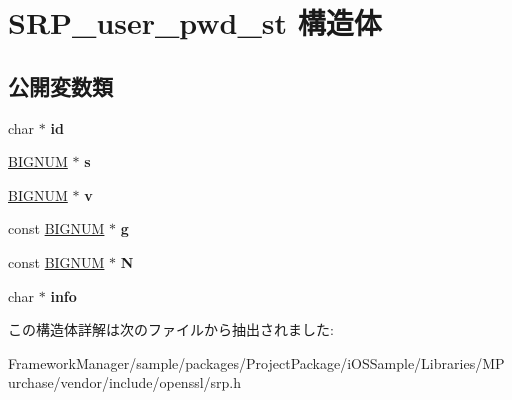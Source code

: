 \hypertarget{struct_s_r_p__user__pwd__st}{}\section{S\+R\+P\+\_\+user\+\_\+pwd\+\_\+st 構造体}
\label{struct_s_r_p__user__pwd__st}
\subsection*{公開変数類}
\begin{DoxyCompactItemize}
\item 
\hypertarget{struct_s_r_p__user__pwd__st_aac2cd2ebc30d6a9834480589fea69085}{}char $\ast$ {\bfseries id}\label{struct_s_r_p__user__pwd__st_aac2cd2ebc30d6a9834480589fea69085}

\item 
\hypertarget{struct_s_r_p__user__pwd__st_a0307e6a70f90139d77f610d6bb956513}{}\hyperlink{structbignum__st}{B\+I\+G\+N\+U\+M} $\ast$ {\bfseries s}\label{struct_s_r_p__user__pwd__st_a0307e6a70f90139d77f610d6bb956513}

\item 
\hypertarget{struct_s_r_p__user__pwd__st_a2eed7def431386ce2b0a80c7df559529}{}\hyperlink{structbignum__st}{B\+I\+G\+N\+U\+M} $\ast$ {\bfseries v}\label{struct_s_r_p__user__pwd__st_a2eed7def431386ce2b0a80c7df559529}

\item 
\hypertarget{struct_s_r_p__user__pwd__st_a66e1a6f4c6de6a26791cd9dac942f2bc}{}const \hyperlink{structbignum__st}{B\+I\+G\+N\+U\+M} $\ast$ {\bfseries g}\label{struct_s_r_p__user__pwd__st_a66e1a6f4c6de6a26791cd9dac942f2bc}

\item 
\hypertarget{struct_s_r_p__user__pwd__st_a42b7405c1f178f4a7e907cb15fdcf9b8}{}const \hyperlink{structbignum__st}{B\+I\+G\+N\+U\+M} $\ast$ {\bfseries N}\label{struct_s_r_p__user__pwd__st_a42b7405c1f178f4a7e907cb15fdcf9b8}

\item 
\hypertarget{struct_s_r_p__user__pwd__st_afcd32dcd1559a02ae11529cbeea3997e}{}char $\ast$ {\bfseries info}\label{struct_s_r_p__user__pwd__st_afcd32dcd1559a02ae11529cbeea3997e}

\end{DoxyCompactItemize}


この構造体詳解は次のファイルから抽出されました\+:\begin{DoxyCompactItemize}
\item 
Framework\+Manager/sample/packages/\+Project\+Package/i\+O\+S\+Sample/\+Libraries/\+M\+Purchase/vendor/include/openssl/srp.\+h\end{DoxyCompactItemize}
